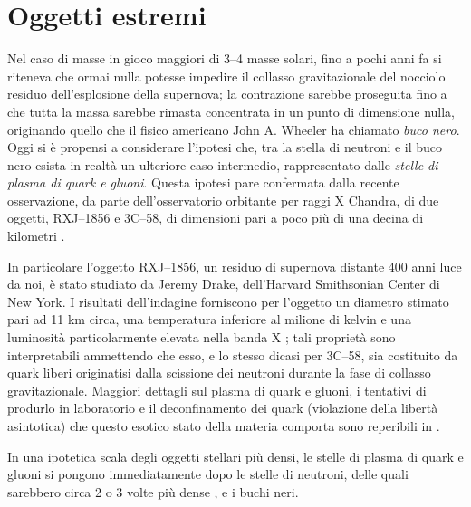 
\chapter{Oggetti estremi}\label{buchi neri}
\minitoc\mtcskip
Nel caso di masse in gioco maggiori di 3--4 masse solari, fino a pochi anni fa si riteneva che ormai nulla potesse impedire il collasso gravitazionale del nocciolo residuo dell'esplosione della supernova; la contrazione sarebbe proseguita fino a che tutta la massa sarebbe rimasta concentrata in un punto di dimensione nulla, originando quello che il fisico americano John A. Wheeler ha chiamato \emph{buco nero}.
Oggi si è propensi a considerare l'ipotesi che, tra la stella di neutroni e il buco nero esista in realt\`{a} un ulteriore caso intermedio, rappresentato dalle \emph{stelle di plasma di quark e gluoni}.
Questa ipotesi pare confermata dalla recente osservazione, da parte dell'osservatorio orbitante per raggi X Chandra, di due oggetti, RXJ--1856 e 3C--58, di dimensioni pari a poco più di una decina di kilometri \Cite{regge}.
\par
In particolare l'oggetto RXJ--1856, un residuo di supernova distante 400 anni luce da noi, è stato studiato da Jeremy Drake, dell'Harvard Smithsonian Center di New York. I risultati dell'indagine forniscono per l'oggetto un diametro stimato pari ad 11 km circa, una temperatura inferiore al milione di kelvin e una luminosit\`{a} particolarmente elevata nella banda X \Cite{cardone}; tali propriet\`{a} sono interpretabili ammettendo che esso, e lo stesso dicasi per 3C--58, sia costituito da quark liberi originatisi dalla scissione dei neutroni durante la fase di collasso gravitazionale.
Maggiori dettagli sul plasma di quark e gluoni, i tentativi di produrlo in laboratorio e il deconfinamento dei quark (violazione della libert\`{a} asintotica) che questo esotico stato della materia comporta sono reperibili in \Cite{antinori}.
\par
In una ipotetica scala degli oggetti stellari più densi, le stelle di plasma di quark e gluoni si pongono immediatamente dopo le stelle di neutroni, delle quali sarebbero circa 2 o 3 volte più dense \Cite{cardone}, e i buchi neri.
